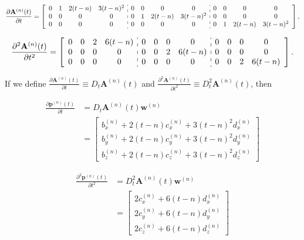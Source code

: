 \small
\begin{equation}\label{eq:primeder1}
\frac{\partial \mathbf{A}^{(n)}(t)}{\partial t}=
\left[
\begin{array}{cccc:cccc:cccc}
0 & 1 & 2(t-n) & 3(t-n)^{2} &
0 & 0 & 0 & 0 &
0 & 0 & 0 & 0 \\
0 & 0 & 0 & 0 &
0 & 1 & 2(t-n) & 3(t-n)^{2} &
0 & 0 & 0 & 0 \\
0 & 0 & 0 & 0 &
0 & 0 & 0 & 0 &
0 & 1 & 2(t-n) & 3(t-n)^{2} 
\end{array}
\right],
\end{equation}
\normalsize

\small
\begin{equation}\label{eq:primeder2}
\frac{\partial^{2} \mathbf{A}^{(n)}(t)}{\partial t^{2}}=
\left[
\begin{array}{cccc:cccc:cccc}
0 & 0 & 2 & 6(t-n) &
0 & 0 & 0 & 0 &
0 & 0 & 0 & 0 \\
0 & 0 & 0 & 0 &
0 & 0 & 2 & 6(t-n) &
0 & 0 & 0 & 0 \\
0 & 0 & 0 & 0 &
0 & 0 & 0 & 0 &
0 & 0 & 2 & 6(t-n) 
\end{array}
\right].
\end{equation}
\normalsize

 If we define 
 $\frac{\partial \mathbf{A}^{(n)}(t)}{\partial t} \equiv D_{t}\mathbf{A}^{(n)}(t)$
 and
 $\frac{\partial^{2} \mathbf{A}^{(n)}(t)}{\partial t^{2}} \equiv D_{t}^{2}\mathbf{A}^{(n)}(t)$, 
 then
 
\begin{align}\label{eq:primeder3a}
\frac{\partial \mathbf{p}^{(n)}(t)}{\partial t}
&=
D_{t}\mathbf{A}^{(n)}(t) \mathbf{w}^{(n)} \\
~
&=
\begin{bmatrix}
b_{x}^{(n)}+2(t-n) c_{x}^{(n)}+3(t-n)^{2} d_{x}^{(n)}\\
b_{y}^{(n)}+2(t-n) c_{y}^{(n)}+3(t-n)^{2} d_{y}^{(n)}\\
b_{z}^{(n)}+2(t-n) c_{z}^{(n)}+3(t-n)^{2} d_{z}^{(n)}
\end{bmatrix}
\end{align}


\begin{align}\label{eq:primeder3b}
\frac{\partial^{2} \mathbf{p}^{(n)}(t)}{\partial t^{2}}
&=
D_{t}^{2}\mathbf{A}^{(n)}(t) \mathbf{w}^{(n)}\\
~ 
&=
\begin{bmatrix}
2 c_{x}^{(n)}+6(t-n) d_{x}^{(n)}\\
2 c_{y}^{(n)}+6(t-n) d_{y}^{(n)}\\
2 c_{z}^{(n)}+6(t-n) d_{z}^{(n)}
\end{bmatrix}
\end{align}



